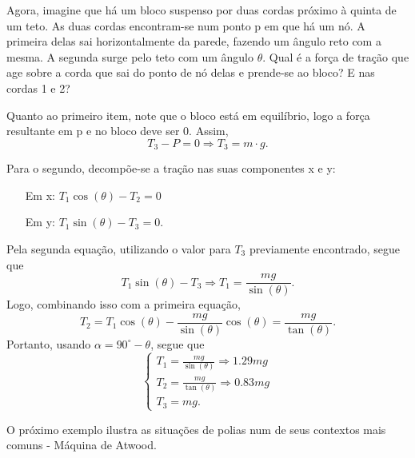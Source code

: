 \documentclass[physics_notes.tex]{subfiles}
\begin{document}
\begin{example}
	Agora, imagine que há um bloco suspenso por duas cordas próximo à quinta de um teto. As duas cordas encontram-se num
	ponto p em que há um nó. A primeira delas sai horizontalmente da parede, fazendo um ângulo reto com a mesma. A segunda
	surge pelo teto com um ângulo $\theta .$ Qual é a força de tração que age sobre a corda que sai do ponto de nó
	delas e prende-se ao bloco? E nas cordas 1 e 2?

	Quanto ao primeiro item, note que o bloco está em equilíbrio, logo a força resultante em p e no bloco deve ser 0.
	Assim,
	$$
		T_{3}-P = 0 \Rightarrow  T_{3} = m \cdot g.
	$$

	Para o segundo, decompõe-se a tração nas suas componentes x e y:
	\begin{itemize}
		\item[Em x:] $T_{1}\cos{(\theta )}-T_{2}=0$
		\item[Em y:] $T_{1}\sin{(\theta )}-T_{3}=0.$
	\end{itemize}
	Pela segunda equação, utilizando o valor para $T_{3}$ previamente encontrado, segue que
	$$
		T_{1}\sin{(\theta )} - T_{3}\Rightarrow T_{1}=\frac{mg}{\sin{(\theta )}}.
	$$
	Logo, combinando isso com a primeira equação,
	$$
		T_{2}=T_{1}\cos{(\theta )} - \frac{mg}{\sin{(\theta )}}\cos{(\theta )} = \frac{mg}{\tan{(\theta )}}.
	$$
	Portanto, usando $\alpha =90^{\circ} - \theta $, segue que
	$$
		\left\{\begin{array}{ll}
			T_{1}=\frac{mg}{\sin{(\theta )}} \Rightarrow 1.29mg \\
			T_{2}=\frac{mg}{\tan{(\theta )}} \Rightarrow 0.83mg \\
			T_{3}=mg.
		\end{array}\right.
	$$
\end{example}
O próximo exemplo ilustra as situações de polias num de seus contextos mais comuns - Máquina de Atwood.
\end{document}
